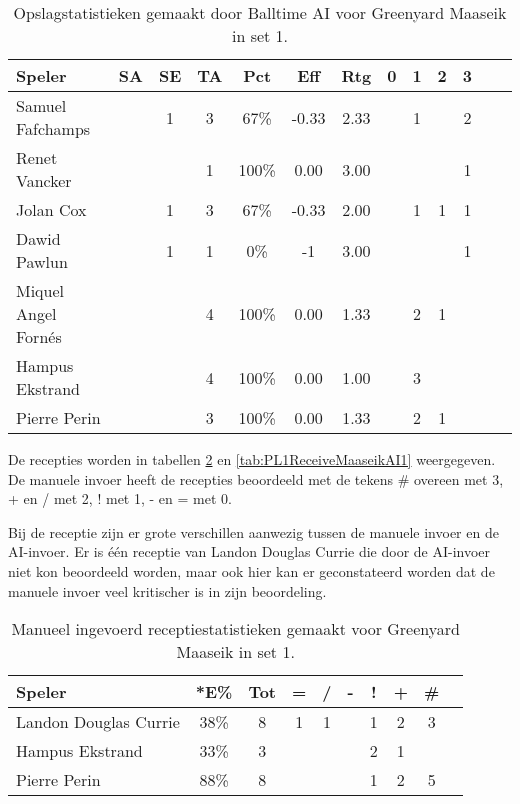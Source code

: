 \begin{table}[ht!]
  \centering
  \scriptsize
  \begin{tabular}{|l|c|c|c|c|c|c|c|c|c|c|c|c|} \hline
    \textbf{Speler} & SA & SE & TA & Pct & Eff & Rtg & 0 & 1 & 2 & 3 \\ \hline
    Samuel Fafchamps &  & 1 & 3 & 67\% & -0.33 & 2.33 &  & 1 &  & 2  \\
    Renet Vancker &  &  & 1 & 100\% & 0.00 & 3.00 &  &  &  & 1  \\
    Jolan Cox &  & 1 & 3 & 67\% & -0.33 & 2.00 &  & 1 & 1 & 1 \\
    Dawid Pawlun &  & 1 & 1 & 0\% & -1 & 3.00 &  &  &  & 1 \\
    Miquel Angel Fornés &  &  & 4 & 100\% & 0.00 & 1.33 &  & 2 & 1 & \\
    Hampus Ekstrand &  &  & 4 & 100\% & 0.00 & 1.00 &  & 3 &  & \\
    Pierre Perin &  &  & 3 & 100\% & 0.00 & 1.33 &  & 2 & 1 & \\ \hline
  \end{tabular}
  \caption[Opslagstatistieken gemaakt door Balltime AI voor Greenyard Maaseik in set 1]{\label{tab:PL1ServeMaaseikAI1}Opslagstatistieken gemaakt door Balltime AI voor Greenyard Maaseik in set 1.}
\end{table}

De recepties worden in tabellen \ref{tab:PL1ReceiveMaaseikMan1} en \ref{tab:PL1ReceiveMaaseikAI1} weergegeven. De manuele invoer heeft de recepties beoordeeld met de tekens \# overeen met 3, + en / met 2, ! met 1, - en = met 0.

Bij de receptie zijn er grote verschillen aanwezig tussen de manuele invoer en de AI-invoer. Er is één receptie van Landon Douglas Currie die door de AI-invoer niet kon beoordeeld worden, maar ook hier kan er geconstateerd worden dat de manuele invoer veel kritischer is in zijn beoordeling. 

\begin{table}[ht!]
    \centering
    \scriptsize
    \begin{tabular}{|l|c|c|c|c|c|c|c|c|c|} \hline
        \textbf{Speler} & *E\% & Tot & = & / & - & ! & + & \# \\ \hline
        Landon Douglas Currie & 38\% & 8 & 1 & 1 &  & 1 & 2 & 3 \\ 
        Hampus Ekstrand & 33\% & 3 &  &  &  & 2 & 1 &  \\ 
        Pierre Perin & 88\% & 8 &  &  &  & 1 & 2 & 5  \\ \hline
    \end{tabular}
    \caption[Manueel ingevoerde receptiestatistieken gemaakt voor Greenyard Maaseik in set 1]{\label{tab:PL1ReceiveMaaseikMan1}Manueel ingevoerd receptiestatistieken gemaakt voor Greenyard Maaseik in set 1.}
\end{table}

